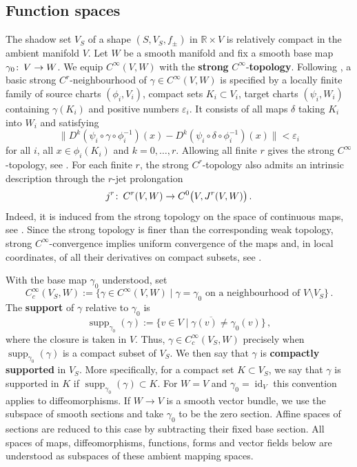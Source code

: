 \documentclass{amsart}
\theoremstyle{definition}
\def\co{\colon\thinspace}
\newcommand{\R}{\mathbb R}
\newcommand{\ra}{\rightarrow}
\DeclareMathOperator{\id}{\mathrm{id}}
\DeclareMathOperator{\supp}{\mathrm{supp}}
\begin{document}

\subsection{Function spaces}
\label{subsec:functionspaces}

The shadow set $V_S$
of a shape $(S,V_S,f_{\pm})$ in $\R\times V$
is relatively compact in the ambient manifold $V$.
Let $W$ be a smooth manifold and fix a smooth base map
$\gamma_0\co V\ra W$.
We equip $C^{\infty}(V,W)$
with the {\bf strong} $C^{\infty}$-{\bf topology}.
Following \cite[Chapter~2, p.~35]{hir76},
a basic strong $C^r$-neighbourhood of
$\gamma\in C^{\infty}(V,W)$ is specified by
a locally finite family of source charts $(\phi_i,V_i)$,
compact sets $K_i\subset V_i$,
target charts $(\psi_i,W_i)$ containing $\gamma(K_i)$
and positive numbers $\varepsilon_i$.
It consists of all maps $\delta$ taking $K_i$ into $W_i$
and satisfying
\[
\big\|
D^k(\psi_i\circ\gamma\circ\phi_i^{-1})(x)
-D^k(\psi_i\circ\delta\circ\phi_i^{-1})(x)
\big\|<\varepsilon_i
\]
for all $i$, all $x\in\phi_i(K_i)$
and $k=0,\ldots,r$.
Allowing all finite $r$ gives the strong $C^{\infty}$-topology,
see \cite[Chapter~2, p.~36]{hir76}.
For each finite $r$, the strong $C^r$-topology
also admits an intrinsic description through
the $r$-jet prolongation
\[
j^r\co C^r(V,W)\ra C^0\big(V,J^r(V,W)\big)
\,.
\]
Indeed,
it is induced from the strong topology
on the space of continuous maps,
see \cite[Chapter~2, p.~62]{hir76}.
Since the strong topology is finer
than the corresponding weak topology,
strong $C^{\infty}$-convergence implies
uniform convergence of the maps
and, in local coordinates, of all their derivatives
on compact subsets,
see \cite[Chapter~2, pp.~58--62]{hir76}.

With the base map $\gamma_0$ understood, set
\[
C_c^{\infty}(V_S,W):=
\big\{
\gamma\in C^{\infty}(V,W)
\mid
\gamma=\gamma_0\text{ on a neighbourhood of }V\setminus V_S
\big\}
\,.
\]
The {\bf support} of $\gamma$ relative to $\gamma_0$ is
\[
\supp_{\gamma_0\!}(\gamma):=
\overline{\{v\in V\mid\gamma(v)\ne\gamma_0(v)\}}
\,,
\]
where the closure is taken in $V$.
Thus, $\gamma\in C_c^{\infty}(V_S,W)$ precisely when
$\supp_{\gamma_0\!}(\gamma)$ is a compact subset of $V_S$.
We then say that $\gamma$ is
{\bf compactly supported} in $V_S$.
More specifically, for a compact set $K\subset V_S$,
we say that $\gamma$ is supported in $K$ if
$\supp_{\gamma_0\!}(\gamma)\subset K$.
For $W=V$ and $\gamma_0=\id_V$
this convention applies to diffeomorphisms.
If $W\ra V$ is a smooth vector bundle,
we use the subspace of smooth sections and take
$\gamma_0$ to be the zero section.
Affine spaces of sections are reduced to this case
by subtracting their fixed base section.
All spaces of maps, diffeomorphisms, functions,
forms and vector fields below
are understood as subspaces of these ambient mapping spaces.
\end{document}
